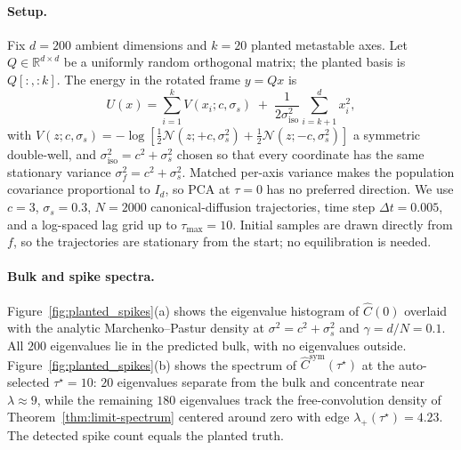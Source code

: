 \documentclass{article}
\begin{document}
\paragraph{Setup.}
Fix $d = 200$ ambient dimensions and $k = 20$ planted metastable axes. Let $Q \in \mathbb{R}^{d \times d}$ be a uniformly random orthogonal matrix; the planted basis is $Q[:, :k]$. The energy in the rotated frame $y = Qx$ is
\[
U(x) = \sum_{i=1}^{k} V(x_i; c, \sigma_s) \;+\; \frac{1}{2 \sigma_{\mathrm{iso}}^2} \sum_{i=k+1}^{d} x_i^2,
\]
with $V(z; c, \sigma_s) = -\log\!\left[\tfrac{1}{2}\mathcal{N}(z; +c, \sigma_s^2) + \tfrac{1}{2}\mathcal{N}(z; -c, \sigma_s^2)\right]$ a symmetric double-well, and $\sigma_{\mathrm{iso}}^2 = c^2 + \sigma_s^2$ chosen so that every coordinate has the same stationary variance $\sigma_f^2 = c^2 + \sigma_s^2$. Matched per-axis variance makes the population covariance proportional to $I_d$, so PCA at $\tau = 0$ has no preferred direction. We use $c = 3$, $\sigma_s = 0.3$, $N = 2000$ canonical-diffusion trajectories, time step $\Delta t = 0.005$, and a log-spaced lag grid up to $\tau_{\max} = 10$. Initial samples are drawn directly from $f$, so the trajectories are stationary from the start; no equilibration is needed.

\paragraph{Bulk and spike spectra.}
Figure~\ref{fig:planted_spikes}(a) shows the eigenvalue histogram of $\hat C(0)$ overlaid with the analytic Marchenko--Pastur density at $\sigma^2 = c^2 + \sigma_s^2$ and $\gamma = d/N = 0.1$. All $200$ eigenvalues lie in the predicted bulk, with no eigenvalues outside. Figure~\ref{fig:planted_spikes}(b) shows the spectrum of $\hat C^{\mathrm{sym}}(\tau^\star)$ at the auto-selected $\tau^\star = 10$: $20$ eigenvalues separate from the bulk and concentrate near $\lambda \approx 9$, while the remaining $180$ eigenvalues track the free-convolution density of Theorem~\ref{thm:limit-spectrum} centered around zero with edge $\lambda_+(\tau^\star) = 4.23$. The detected spike count equals the planted truth.
\end{document}
